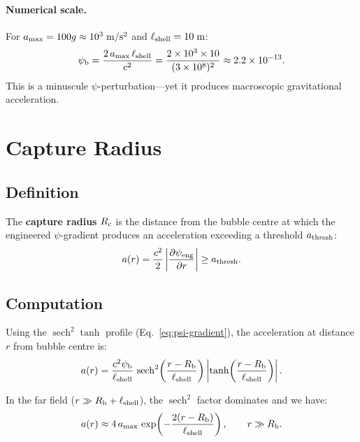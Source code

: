 \documentclass[12pt,aps,prd,superscriptaddress,nofootinbib]{revtex4-2}
\newcommand{\psib}{\psi_{\rm b}}
\newcommand{\Rb}{R_{\rm b}}
\newcommand{\Rc}{R_{\rm c}}
\newcommand{\Lshell}{\ell_{\rm shell}}
\begin{document}
\paragraph{Numerical scale.}
For $a_{\rm max} = 100g \approx 10^3\;\si{m/s^2}$ and
$\Lshell = 10\;\si{m}$:
\begin{equation}
\psib = \frac{2\,a_{\rm max}\,\Lshell}{c^2}
= \frac{2 \times 10^3 \times 10}{(3\times 10^8)^2}
\approx 2.2 \times 10^{-13}.
\end{equation}
This is a minuscule $\psi$-perturbation---yet it produces
macroscopic gravitational acceleration.


\section{Capture Radius}\label{sec:capture}

\subsection{Definition}

The \textbf{capture radius} $\Rc$ is the distance from the bubble
centre at which the engineered $\psi$-gradient produces an
acceleration exceeding a threshold $a_{\rm thresh}$:
\begin{equation}
a(r) = \frac{c^2}{2}\left|\frac{\partial\psi_{\rm eng}}
  {\partial r}\right| \geq a_{\rm thresh}.
\label{eq:capture-def}
\end{equation}

\subsection{Computation}

Using the $\operatorname{sech}^2\tanh$ profile
(Eq.~\ref{eq:psi-gradient}), the acceleration at distance $r$ from
bubble centre is:
\begin{equation}
a(r) = \frac{c^2\psib}{\Lshell}\,\operatorname{sech}^2\!\left(
  \frac{r - \Rb}{\Lshell}\right)
\left|\tanh\!\left(\frac{r - \Rb}{\Lshell}\right)\right|.
\end{equation}

In the far field ($r \gg \Rb + \Lshell$), the $\operatorname{sech}^2$
factor dominates and we have:
\begin{equation}
a(r) \approx 4\,a_{\rm max}\,
  \exp\!\left(-\frac{2(r - \Rb)}{\Lshell}\right),
  \qquad r \gg \Rb.
\end{equation}
\end{document}
